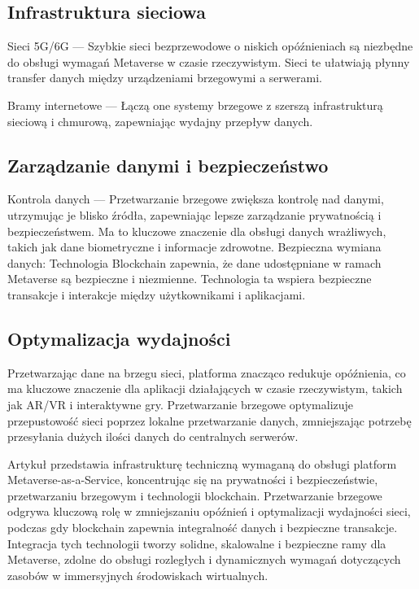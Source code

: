 \subsection{Infrastruktura sieciowa}

Sieci 5G/6G --- Szybkie sieci bezprzewodowe o niskich opóźnieniach są niezbędne do obsługi wymagań Metaverse w czasie rzeczywistym. Sieci te ułatwiają płynny transfer danych między urządzeniami brzegowymi a serwerami. 

Bramy internetowe --- Łączą one systemy brzegowe z szerszą infrastrukturą sieciową i chmurową, zapewniając wydajny przepływ danych.

\subsection{Zarządzanie danymi i bezpieczeństwo}

Kontrola danych --- Przetwarzanie brzegowe zwiększa kontrolę nad danymi, utrzymując je blisko źródła, zapewniając lepsze zarządzanie prywatnością i bezpieczeństwem. Ma to kluczowe znaczenie dla obsługi danych wrażliwych, takich jak dane biometryczne i informacje zdrowotne.
Bezpieczna wymiana danych: Technologia Blockchain zapewnia, że dane udostępniane w ramach Metaverse są bezpieczne i niezmienne. Technologia ta wspiera bezpieczne transakcje i interakcje między użytkownikami i aplikacjami.

\subsection{Optymalizacja wydajności}

Przetwarzając dane na brzegu sieci, platforma znacząco redukuje opóźnienia, co ma kluczowe znaczenie dla aplikacji działających w czasie rzeczywistym, takich jak AR/VR i interaktywne gry.
Przetwarzanie brzegowe optymalizuje przepustowość sieci poprzez lokalne przetwarzanie danych, zmniejszając potrzebę przesyłania dużych ilości danych do centralnych serwerów.

Artykuł przedstawia infrastrukturę techniczną wymaganą do obsługi platform Metaverse-as-a-Service, koncentrując się na prywatności i bezpieczeństwie, przetwarzaniu brzegowym i technologii blockchain. Przetwarzanie brzegowe odgrywa kluczową rolę w zmniejszaniu opóźnień i optymalizacji wydajności sieci, podczas gdy blockchain zapewnia integralność danych i bezpieczne transakcje. Integracja tych technologii tworzy solidne, skalowalne i bezpieczne ramy dla Metaverse, zdolne do obsługi rozległych i dynamicznych wymagań dotyczących zasobów w immersyjnych środowiskach wirtualnych.


